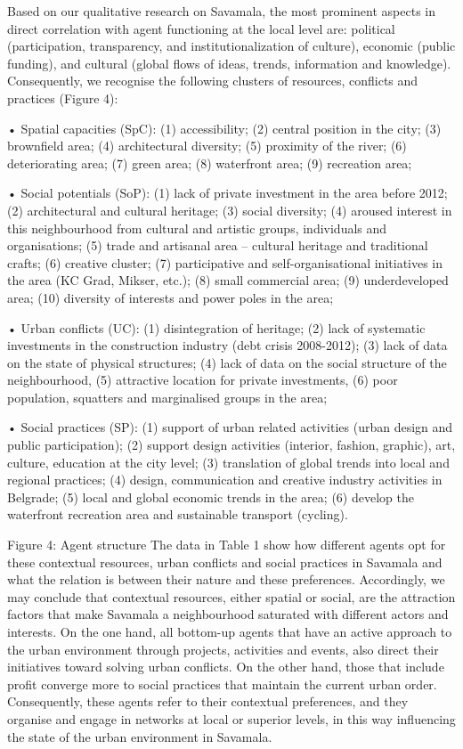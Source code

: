 \documentclass[11pt]{report}
\begin{document}
Based on our qualitative research on Savamala, the most prominent aspects in direct correlation with agent functioning at the local level are: political (participation, transparency, and institutionalization of culture), economic (public funding), and cultural (global flows of ideas, trends, information and knowledge). Consequently, we recognise the following clusters of resources, conflicts and practices (Figure 4):

•	Spatial capacities (SpC): (1) accessibility; (2) central position in the city; (3) brownfield area; (4) architectural diversity; (5) proximity of the river; (6) deteriorating area; (7) green area; (8) waterfront area; (9) recreation area;

•	Social potentials (SoP): (1) lack of private investment in the area before 2012; (2) architectural and cultural heritage; (3) social diversity; (4) aroused interest in this neighbourhood from cultural and artistic groups, individuals and organisations; (5) trade and artisanal area – cultural heritage and traditional crafts; (6) creative cluster; (7) participative and self-organisational initiatives in the area (KC Grad, Mikser, etc.); (8) small commercial area; (9) underdeveloped area; (10) diversity of interests and power poles in the area;

•	Urban conflicts (UC): (1) disintegration of heritage; (2) lack of systematic investments in the construction industry (debt crisis 2008-2012); (3) lack of data on the state of physical structures; (4) lack of data on the social structure of the neighbourhood, (5) attractive location for private investments, (6) poor population, squatters and marginalised groups in the area;

•	Social practices (SP): (1) support of urban related activities (urban design and public participation); (2) support design activities (interior, fashion, graphic), art, culture, education at the city level; (3) translation of global trends into local and regional practices; (4) design, communication and creative industry activities in Belgrade; (5) local and global economic trends in the area; (6) develop the waterfront recreation area and sustainable transport (cycling).

Figure 4: Agent structure
The data in Table 1 show how different agents opt for these contextual resources, urban conflicts and social practices in Savamala and what the relation is between their nature and these preferences. Accordingly, we may conclude that contextual resources, either spatial or social, are the attraction factors that make Savamala a neighbourhood saturated with different actors and interests. On the one hand, all bottom-up agents that have an active approach to the urban environment through projects, activities and events, also direct their initiatives toward solving urban conflicts. On the other hand, those that include profit converge more to social practices that maintain the current urban order. Consequently, these agents refer to their contextual preferences, and they organise and engage in networks at local or superior levels, in this way influencing the state of the urban environment in Savamala.
\end{document}
